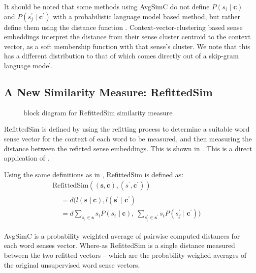\documentclass{sig-alternate}
\renewcommand{\c}{\mathbf{c}}
\newcommand{\s}{\mathbf{s}}
\begin{document}
It should be noted that some methods using AvgSimC  do not define  $P(s_{i}\mid\c)$ and $P(s_{j}^{\prime}\mid\c^\prime)$ with a probabilistic language model based method, but rather define them using the distance function \parencite{Reisinger2010, Huang2012}. Context-vector-clustering based sense embeddings interpret the distance from their sense cluster centroid to the context vector, as a soft membership function with that sense's cluster. We note that this has a different distribution to that of which comes directly out of a skip-gram language model.



\subsection{A New Similarity Measure: RefittedSim}\label{RefittedSimVsAvgSimC}
\begin{figure}
	\begin{adjustbox}{max width=\columnwidth}
	
	\end{adjustbox}
	\caption{ block diagram for RefittedSim similarity measure} \label{diaRefittedSim}
\end{figure}

RefittedSim is defined by using the refitting process to determine a suitable word sense vector for the context of each word to be measured, and then measuring the distance between the refitted sense embeddings. This is shown in .
This is a direct application of  . 

Using the same definitions as in , RefittedSim is defined as:
\begin{multline} \label{eq:refittedsim}
\mathrm{RefittedSim}((\s,\c),(s^{\prime},\c^{\prime}))\\
\begin{aligned}
&= d(l(\s \mid \c), l(\s^\prime \mid \c^\prime)\\
&= d
\sum_{s_{i}\in\s}s_{i}P(s_{i}\mid\c),\:
\sum_{s_{j}^{\prime}\in\s^{\prime}}s_{i}P(s_{j}^{\prime}\mid\c^{\prime}))
\end{aligned}
\end{multline}

AvgSimC is a probability weighted average of pairwise computed distances for each word senses vector.
Where-as RefittedSim is a single distance measured between the two refitted vectors -- which are the probability weighed averages of the original unsupervised word sense vectors.
\end{document}
